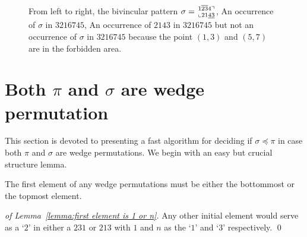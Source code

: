 \documentclass[a4paper]{llncs}
\newcommand\BV[2]{\genfrac{}{}{0pt}{}{#1}{#2}}
\begin{document}
\begin{figure}[t]
    	 
    	 
    	    	
    	\caption[Example pattern matching]{
    		From left to right,
    		the bivincular pattern $\sigma = \BV{1\overline{23}4\urcorner}{\llcorner 21\underline{43}  }$, An occurrence of $\sigma$ in $3216745$, An occurrence of $2143$ in $3216745$ but not an occurrence of $\sigma$ in $3216745$ because the point $(1,3)$ and $(5,7)$ are in the forbidden area.} 
    	\label{example:bivincular pattern matching}
\end{figure}


\section{Both $\pi$ and $\sigma$ are wedge permutation}
\label{section:both are (213,231)-avoiding}



This section is devoted to presenting a fast algorithm for deciding if
$\sigma \preceq \pi$
in case both $\pi$ and $\sigma$ are wedge permutations.
We begin with an easy but crucial structure lemma.

\begin{lemma} %
\label{lemma:first element is 1 or n}
The first element of any wedge permutations
must be either the bottommost or the topmost element.
\end{lemma}

\begin{proof}[of Lemma~\ref{lemma:first element is 1 or n}]
Any other initial element would serve as a `$2$' in either a
$231$ or $213$ with $1$ and $n$ as the `$1$' and `$3$' respectively.
\qed
\end{proof}
\end{document}
